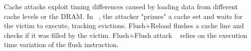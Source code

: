 



Cache attacks exploit timing differences caused by loading data from different cache levels or the DRAM.
In \PrimeProbe~\cite{prime_probe,osvik2006cache}, the attacker "primes" a cache set and waits for the victim to execute, tracking evictions. Flush+Reload \cite{flush+reload} flushes a cache line and checks if it was filled by the victim.
Flush+Flush attack ~\cite{GrussFlushFlush} relies on the execution time variation of the flush instruction.


